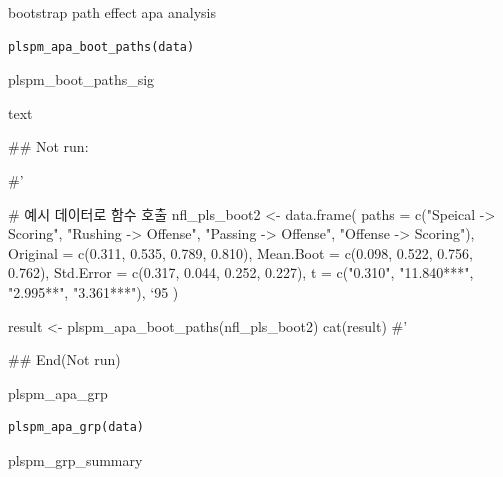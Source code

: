 \documentclass[a4paper]{book}
\begin{document}
%
\begin{Description}
bootstrap path effect apa analysis
\end{Description}
%
\begin{Usage}
\begin{verbatim}
plspm_apa_boot_paths(data)
\end{verbatim}
\end{Usage}
%
\begin{Arguments}
\begin{ldescription}
\item[\code{data}] plspm\_boot\_paths\_sig
\end{ldescription}
\end{Arguments}
%
\begin{Value}
text
\end{Value}
%
\begin{Examples}
\begin{ExampleCode}

## Not run: 

#'

# 예시 데이터로 함수 호출
nfl_pls_boot2 <- data.frame(
  paths = c("Speical -> Scoring", "Rushing -> Offense", "Passing -> Offense", "Offense -> Scoring"),
  Original = c(0.311, 0.535, 0.789, 0.810),
  Mean.Boot = c(0.098, 0.522, 0.756, 0.762),
  Std.Error = c(0.317, 0.044, 0.252, 0.227),
  t = c("0.310", "11.840***", "2.995**", "3.361***"),
  `95%
)

result <- plspm_apa_boot_paths(nfl_pls_boot2)
cat(result)
#'

## End(Not run)

\end{ExampleCode}
\end{Examples}
%
\begin{Description}
plspm\_apa\_grp
\end{Description}
%
\begin{Usage}
\begin{verbatim}
plspm_apa_grp(data)
\end{verbatim}
\end{Usage}
%
\begin{Arguments}
\begin{ldescription}
\item[\code{data}] plspm\_grp\_summary
\end{ldescription}
\end{Arguments}
\end{document}
